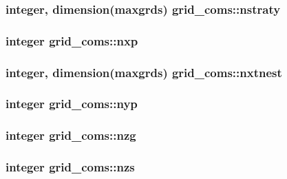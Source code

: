 \subsubsection[{\texorpdfstring{nstraty}{nstraty}}]{\setlength{\rightskip}{0pt plus 5cm}integer, dimension(maxgrds) grid\+\_\+coms\+::nstraty}\hypertarget{namespacegrid__coms_a2886e23677c5f71657725bda33ccaba8}{}\label{namespacegrid__coms_a2886e23677c5f71657725bda33ccaba8}
\subsubsection[{\texorpdfstring{nxp}{nxp}}]{\setlength{\rightskip}{0pt plus 5cm}integer grid\+\_\+coms\+::nxp}\hypertarget{namespacegrid__coms_aff2c702052cc543c317c4feea0dbb76a}{}\label{namespacegrid__coms_aff2c702052cc543c317c4feea0dbb76a}
\subsubsection[{\texorpdfstring{nxtnest}{nxtnest}}]{\setlength{\rightskip}{0pt plus 5cm}integer, dimension(maxgrds) grid\+\_\+coms\+::nxtnest}\hypertarget{namespacegrid__coms_a3a74d4b8ff65bb4d8f8eb2f22a91c68d}{}\label{namespacegrid__coms_a3a74d4b8ff65bb4d8f8eb2f22a91c68d}
\subsubsection[{\texorpdfstring{nyp}{nyp}}]{\setlength{\rightskip}{0pt plus 5cm}integer grid\+\_\+coms\+::nyp}\hypertarget{namespacegrid__coms_af5bde1fabbca5ebe3e44f565781fc950}{}\label{namespacegrid__coms_af5bde1fabbca5ebe3e44f565781fc950}
\subsubsection[{\texorpdfstring{nzg}{nzg}}]{\setlength{\rightskip}{0pt plus 5cm}integer grid\+\_\+coms\+::nzg}\hypertarget{namespacegrid__coms_a142d9d74c03f8fa05eda4634bfbe0b83}{}\label{namespacegrid__coms_a142d9d74c03f8fa05eda4634bfbe0b83}
\subsubsection[{\texorpdfstring{nzs}{nzs}}]{\setlength{\rightskip}{0pt plus 5cm}integer grid\+\_\+coms\+::nzs}\hypertarget{namespacegrid__coms_a760d4b670328e4c3a0a7accfdac64c19}{}\label{namespacegrid__coms_a760d4b670328e4c3a0a7accfdac64c19}
